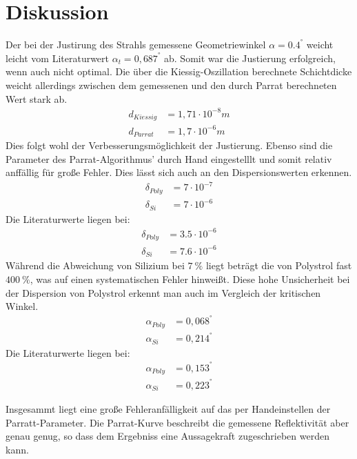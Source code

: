 \section{Diskussion}
\label{sec:Diskussion}

Der bei der Justirung des Strahls gemessene Geometriewinkel $\alpha = 0.4^°$ weicht leicht vom Literaturwert $\alpha_{t} = 0,687^°$ ab.
Somit war die Justierung erfolgreich, wenn auch nicht optimal.
Die über die Kiessig-Oszillation berechnete Schichtdicke weicht allerdings zwischen dem gemessenen 
und den durch Parrat berechneten Wert stark ab.
\begin{align*}
    d_{Kiessig} &= 1,71 \cdot 10^{-8} m \\
    d_{Parrat} &= 1,7 \cdot 10^{-6} m
\end{align*}
Dies folgt wohl der Verbesserungsmöglichkeit der Justierung.
Ebenso sind die Parameter des Parrat-Algorithmus' durch Hand eingestelllt und somit relativ anffällig für große Fehler.
Dies lässt sich auch an den Dispersionswerten erkennen.
\begin{align*}
    \delta_{Poly} &= 7 \cdot 10^{-7}  \\
    \delta_{Si} &= 7 \cdot 10^{-6} 
\end{align*}
Die Literaturwerte \cite{wert} liegen bei:
\begin{align*}
    \delta_{Poly} &= 3.5 \cdot 10^{-6}  \\
    \delta_{Si} &= 7.6 \cdot 10^{-6} 
\end{align*}
Während die Abweichung von Silizium bei $\qty{7}{\percent}$ liegt beträgt die von Polystrol fast $\qty{400}{\percent}$,
was auf einen systematischen Fehler hinweißt.
Diese hohe Unsicherheit bei der Dispersion von Polystrol erkennt man auch im Vergleich der kritischen Winkel.
\begin{align*}
    \alpha_{Poly} &= 0,068^°  \\
    \alpha_{Si} &= 0,214^°
\end{align*}
Die Literaturwerte \cite{wert} liegen bei:
\begin{align*}
    \alpha_{Poly} &= 0,153^°  \\
    \alpha_{Si} &= 0,223^°
\end{align*}

Insgesammt liegt eine große Fehleranfälligkeit auf das per Handeinstellen der Parratt-Parameter.
Die Parrat-Kurve beschreibt die gemessene Reflektivität aber genau genug, 
so dass dem Ergebniss eine Aussagekraft zugeschrieben werden kann.